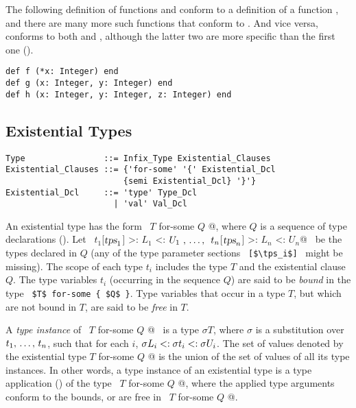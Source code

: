 \example The following definition of functions  and  conform to a definition of a function , and there are many more such functions that conform to . And vice versa,  conforms to both  and , although the latter two are more specific than the first one (). 
\begin{lstlisting}
def f (*x: Integer) end
def g (x: Integer, y: Integer) end
def h (x: Integer, y: Integer, z: Integer) end
\end{lstlisting}






\subsection{Existential Types}
\label{sec:existential-types}

\syntax\begin{lstlisting}[escapechar=@]
Type                ::= Infix_Type Existential_Clauses
Existential_Clauses ::= {'for-some' '{' Existential_Dcl
                        {semi Existential_Dcl} '}'}
Existential_Dcl     ::= 'type' Type_Dcl
                      | 'val' Val_Dcl
\end{lstlisting}

An existential type has the form ~\lstinline@$T$ for-some { $Q$ }@, where $Q$ is a sequence of type declarations (). Let ~\lstinline@$t_1$[$\mbox{\sl tps}_1$] >: $L_1$ <: $U_1\ ,\, \ldots ,\,\ t_n$[$\mbox{\sl tps}_n$] >: $L_n$ <: $U_n$@~ be the types declared in $Q$ (any of the type parameter sections ~\lstinline![$\tps_i$]!~ might be missing). The scope of each type $t_i$ includes the type $T$ and the existential clause $Q$. The type variables $t_i$ (occurring in the sequence $Q$) are said to be {\em bound} in the type ~\lstinline!$T$ for-some { $Q$ }!. Type variables that occur in a type $T$, but which are not bound in $T$, are said to be {\em free} in $T$. 

A {\em type instance} of ~\lstinline@$T$ for-some { $Q$ }@~ is a type $\sigma T$, where $\sigma$ is a substitution over $t_1 ,\, \ldots ,\, t_n$, such that for each $i$, $\sigma L_i <: \sigma t_i <: \sigma U_i$. The set of values denoted by the existential type \lstinline@$T$ for-some { $Q$ }@ is the union of the set of values of all its type instances. In other words, a type instance of an existential type is a type application () of the type ~\lstinline@$T$ for-some { $Q$ }@, where the applied type arguments conform to the bounds, or are free in ~\lstinline@$T$ for-some { $Q$ }@. 

